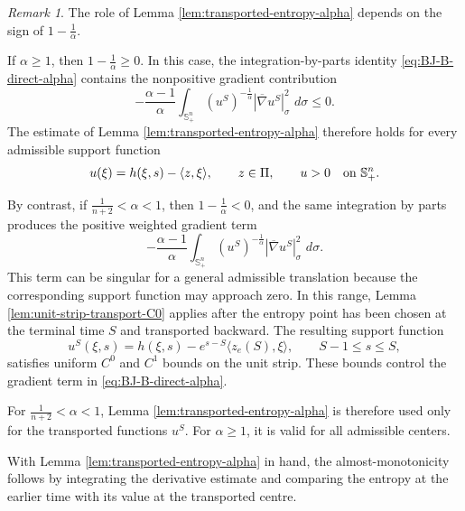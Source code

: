 \documentclass[11pt, reqno]{amsart}
\theoremstyle{remark}
\newtheorem{remark}{Remark}[section]
\theoremstyle{definition}
\numberwithin{equation}{section}
\newcommand{\Sph}{\mathbb S}
\newcommand{\PiH}{\Pi}
\newcommand{\dd}{\,d}
\begin{document}
\begin{remark}
The role of Lemma \ref{lem:transported-entropy-alpha} depends on the sign of $1-\frac{1}{\alpha}$.

If $\alpha\ge1$, then $1-\frac{1}{\alpha}\geq 0$.  In
this case, the integration-by-parts identity \eqref{eq:BJ-B-direct-alpha} contains the nonpositive gradient contribution
\begin{equation*}
        -\frac{\alpha-1}{\alpha}\int_{\mathbb{S}^n_+}(u^S)^{-\frac{1}{\alpha}}
        |\overline\nabla u^S|_\sigma^2\,\dd \sigma \le 0.
\end{equation*}
The estimate of
Lemma \ref{lem:transported-entropy-alpha} therefore holds for every admissible support function
\begin{equation*}
        u(\xi)=h(\xi,s)-\langle z,\xi\rangle,\qquad z\in\PiH,
        \qquad u>0\quad\hbox{on }\Sph^n_+ .
\end{equation*}

By contrast, if $\frac1{n+2}<\alpha<1$, then $1-\frac{1}{\alpha}<0$, and the same integration by parts produces the positive weighted gradient term
\begin{equation*}
        -\frac{\alpha-1}{\alpha}\int_{\mathbb{S}^n_+}(u^S)^{-\frac{1}{\alpha}}
        |\overline\nabla u^S|_\sigma^2\,\dd\sigma.
\end{equation*}
This term can be singular for a general admissible translation because the corresponding support function may approach zero.  In this range, Lemma \ref{lem:unit-strip-transport-C0} applies after the entropy point has been chosen at the terminal time $S$ and transported backward. The resulting support function
\begin{equation*}
        u^S(\xi,s)=h(\xi,s)-e^{s-S}\langle z_e(S),\xi\rangle,
        \qquad S-1\le s\le S,
\end{equation*}
satisfies uniform $C^0$ and $C^1$ bounds on the unit strip. These bounds control the gradient term in \eqref{eq:BJ-B-direct-alpha}. 

For $\frac1{n+2}<\alpha<1$, Lemma \ref{lem:transported-entropy-alpha} is therefore used only for the transported functions $u^S$. For $\alpha\ge1$, it is valid for all admissible centers.
\end{remark}


With Lemma \ref{lem:transported-entropy-alpha} in hand, the almost-monotonicity follows by integrating the derivative estimate and comparing the entropy at the earlier time with its value at the transported centre.
\end{document}

